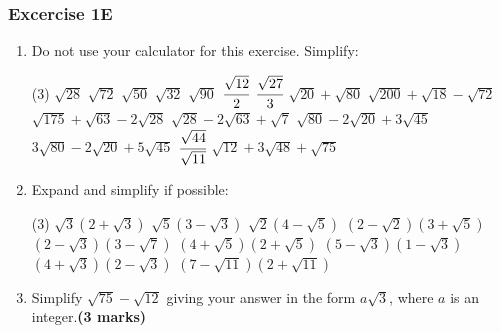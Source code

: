 \documentclass[fleqn]{article}
\newcommand{\exercise}{\subsubsection}
\begin{document}
\exercise{Excercise 1E}
\begin{enumerate}
	\item Do not use your calculator for this exercise. Simplify:
		\begin{tasks}(3) %
			\task $\sqrt{28}$							%
			\task $\sqrt{72}$							%
			\task $\sqrt{50}$							%
			\task $\sqrt{32}$							%
			\task $\sqrt{90}$							%
			\task $\cfrac{\sqrt{12}}{2}$\vspace{-1mm}	%
			\task $\cfrac{\sqrt{27}}{3}$					%
			\task $\sqrt{20}+\sqrt{80}$					%
			\task $\sqrt{200}+\sqrt{18}-\sqrt{72}$		%
			\task $\sqrt{175}+\sqrt{63}-2\sqrt{28}$		%
			\task $\sqrt{28}-2\sqrt{63}+\sqrt{7}$		%
			\task $\sqrt{80}-2\sqrt{20}+3\sqrt{45}$		%
			\task $3\sqrt{80}-2\sqrt{20}+5\sqrt{45}$		%
			\task $\cfrac{\sqrt{44}}{\sqrt{11}}$			%
			\task $\sqrt{12}+3\sqrt{48}+\sqrt{75}$		%
		\end{tasks}
	\item Expand and simplify if possible:
		\begin{tasks}(3) %
			\task $\sqrt{3}(2+\sqrt{3})$					%
			\task $\sqrt{5}(3-\sqrt{3})$					%
			\task $\sqrt{2}(4-\sqrt{5})$					%
			\task $(2-\sqrt{2})(3+\sqrt{5})$				%
			\task $(2-\sqrt{3})(3-\sqrt{7})$				%
			\task $(4+\sqrt{5})(2+\sqrt{5})$				%
			\task $(5-\sqrt{3})(1-\sqrt{3})$				%
			\task $(4+\sqrt{3})(2-\sqrt{3})$				%
			\task $(7-\sqrt{11})(2+\sqrt{11})$			%
		\end{tasks}
	\item Simplify $\sqrt{75}-\sqrt{12}$ giving your answer in the form $a\sqrt{3}$, where $a$ is an integer.\hfill\textbf{(3 marks)} %
\end{enumerate}
\end{document}

